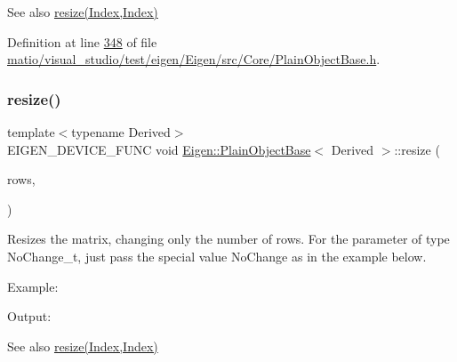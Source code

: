 \begin{DoxySeeAlso}{See also}
\hyperlink{class_eigen_1_1_plain_object_base_a99d9054ee2d5a40c6e00ded0265e9cea}{resize(\+Index,\+Index)} 
\end{DoxySeeAlso}


Definition at line \hyperlink{matio_2visual__studio_2test_2eigen_2_eigen_2src_2_core_2_plain_object_base_8h_source_l00348}{348} of file \hyperlink{matio_2visual__studio_2test_2eigen_2_eigen_2src_2_core_2_plain_object_base_8h_source}{matio/visual\+\_\+studio/test/eigen/\+Eigen/src/\+Core/\+Plain\+Object\+Base.\+h}.

\mbox{\label{class_eigen_1_1_plain_object_base_a7b44761b7350ae3756035bbf7d7c04f6}} 
\subsubsection{\texorpdfstring{resize()}{resize()}\hspace{0.1cm}{\footnotesize\ttfamily [8/8]}}
{\footnotesize\ttfamily template$<$typename Derived$>$ \\
E\+I\+G\+E\+N\+\_\+\+D\+E\+V\+I\+C\+E\+\_\+\+F\+U\+NC void \hyperlink{class_eigen_1_1_plain_object_base}{Eigen\+::\+Plain\+Object\+Base}$<$ Derived $>$\+::resize (\begin{DoxyParamCaption}\item[{\hyperlink{namespace_eigen_a62e77e0933482dafde8fe197d9a2cfde}{Index}}]{rows,  }\item[{No\+Change\+\_\+t}]{ }\end{DoxyParamCaption})\hspace{0.3cm}{\ttfamily [inline]}}

Resizes the matrix, changing only the number of rows. For the parameter of type No\+Change\+\_\+t, just pass the special value {\ttfamily No\+Change} as in the example below.

Example\+: 
\begin{DoxyCodeInclude}
\end{DoxyCodeInclude}
 Output\+: 
\begin{DoxyVerbInclude}
\end{DoxyVerbInclude}


\begin{DoxySeeAlso}{See also}
\hyperlink{class_eigen_1_1_plain_object_base_a99d9054ee2d5a40c6e00ded0265e9cea}{resize(\+Index,\+Index)} 
\end{DoxySeeAlso}


